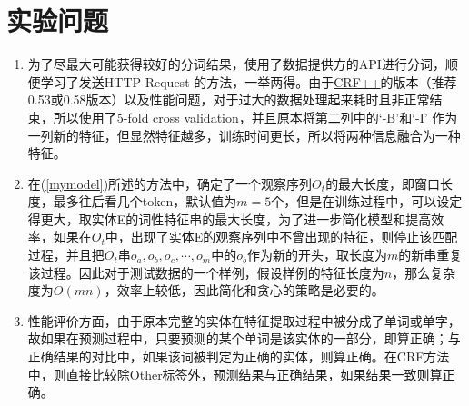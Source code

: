 \documentclass[11pt]{article}
\begin{document}
\section{实验问题}
\begin{enumerate}
\setlength{\itemsep}{-4pt}
  \item 为了尽最大可能获得较好的分词结果，使用了数据提供方的API进行分词，顺便学习了发送HTTP Request 的方法，一举两得。由于\href{http://sourceforge.net/projects/crfpp/}{CRF++}的版本（推荐0.53或0.58版本）以及性能问题，对于过大的数据处理起来耗时且非正常结束，所以使用了5-fold cross validation，并且原本将第二列中的‘-B’和‘-I’ 作为一列新的特征，但显然特征越多，训练时间更长，所以将两种信息融合为一种特征。
  \item 在(\ref{mymodel})所述的方法中，确定了一个观察序列$O_t$的最大长度，即窗口长度，最多往后看几个token，默认值为$m=5$个，但是在训练过程中，可以设定得更大，取实体E的词性特征串的最大长度，为了进一步简化模型和提高效率，如果在$O_t$中，出现了实体E的观察序列中不曾出现的特征，则停止该匹配过程，并且把$O_t$串$o_a, o_b, o_c, \cdots, o_m$中的$o_b$作为新的开头，取长度为$m$的新串重复该过程。因此对于测试数据的一个样例，假设样例的特征长度为$n$，那么复杂度为$O(mn)$，效率上较低，因此简化和贪心的策略是必要的。
  \item 性能评价方面，由于原本完整的实体在特征提取过程中被分成了单词或单字，故如果在预测过程中，只要预测的某个单词是该实体的一部分，即算正确；与正确结果的对比中，如果该词被判定为正确的实体，则算正确。在CRF方法中，则直接比较除Other标签外，预测结果与正确结果，如果结果一致则算正确。
\end{enumerate}
\end{document}

